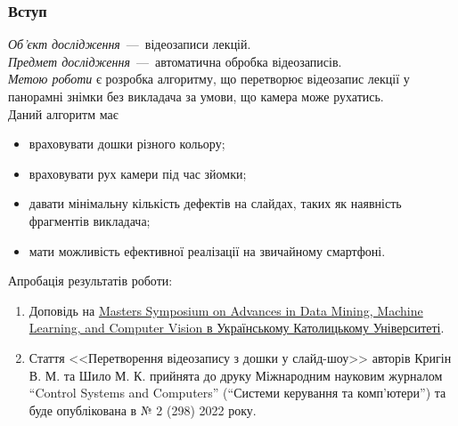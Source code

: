 \begin{frame}
	\frametitle{Вступ}
	\textit{Об'єкт дослідження}~---~відеозаписи лекцій. \\ \textit{Предмет
	дослідження}~---~автоматична обробка відеозаписів. \\ \textit{Метою роботи} є
	розробка алгоритму, що перетворює відеозапис лекції у панорамні знімки без викладача
	за умови, що камера може рухатись. \\ Даний алгоритм має
	\begin{itemize}
		\item враховувати дошки різного кольору;

		\item враховувати рух камери під час зйомки;

		\item давати мінімальну кількість дефектів на слайдах, таких як наявність
			фрагментів викладача;

		\item мати можливість ефективної реалізації на звичайному смартфоні.
	\end{itemize}
	Апробація результатів роботи:
	\begin{enumerate}
		\item Доповідь на \href{https://s3.eu-central-1.amazonaws.com/ucu.edu.ua/wp-content/uploads/sites/8/2021/04/Creating-Slides-from-Video-Lecture.pdf}{Masters
			Symposium on Advances in Data Mining, Machine Learning, and Computer
			Vision в Українському Католицькому Університеті}.

		\item Стаття <<Перетворення відеозапису з дошки у слайд-шоу>> авторів Кригін
			В. М. та Шило М. К. прийнята до друку Міжнародним науковим журналом “Control
			Systems and Computers” (“Системи керування та комп'ютери”) та буде опублікована
			в № 2 (298) 2022 року.
	\end{enumerate}
\end{frame}